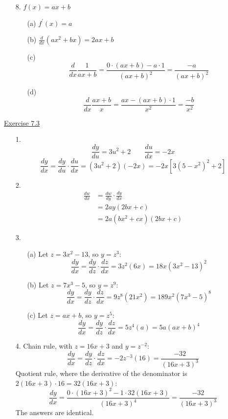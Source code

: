 \begin{enumerate}
\item[8.] $f(x)=a x+b$
\begin{enumerate}
\item[(a)] $f^{\prime}(x)=a$
\item[(b)] $\frac{d}{d x}\left(a x^{2}+b x\right)=2 a x+b$
\item[(c)] \[ \frac{d}{d x} \frac{1}{a x+b}=\frac{0 \cdot(a x+b)-a \cdot 1}{(a x+b)^{2}}=\frac{-a}{(a x+b)^{2}} \]
\item[(d)] \[ \frac{d}{d x} \frac{a x+b}{x}=\frac{a x-(a x+b) \cdot 1}{x^{2}}=\frac{-b}{x^{2}} \]
\end{enumerate}
\end{enumerate}

\underline{Exercise 7.3}
\begin{enumerate}
\item[1.]
\[ \frac{d y}{d u}=3 u^{2}+2 \qquad \frac{d u}{d x}=-2 x \]
\[ \frac{d y}{d x}=\frac{d y}{d u} \cdot \frac{d u}{d x}=\left(3 u^{2}+2\right)(-2 x)=-2 x\left[3\left(5-x^{2}\right)^{2}+2\right] \]

\item[2.]
\[
\begin{aligned}
\frac{d w}{d x} &=\frac{d w}{d y} \cdot \frac{d y}{d x} \\
&=2 a y(2 b x+c) \\
&=2 a\left(b x^{2}+c x\right)(2 b x+c)
\end{aligned}
\]

\item[3.]
\begin{enumerate}
\item[(a)] Let $z=3 x^{2}-13$, so $y=z^{3}$:
\[ \frac{d y}{d x}=\frac{d y}{d z} \cdot \frac{d z}{d x}=3 z^{2}(6 x)=18 x\left(3 x^{2}-13\right)^{2} \]
\item[(b)] Let $z=7 x^{3}-5$, so $y=z^{9}$:
\[ \frac{d y}{d x}=\frac{d y}{d z} \cdot \frac{d z}{d x}=9 z^{8}\left(21 x^{2}\right)=189 x^{2}\left(7 x^{3}-5\right)^{8} \]
\item[(c)] Let $z=a x+b$, so $y=z^{5}$:
\[ \frac{d y}{d x}=\frac{d y}{d z} \cdot \frac{d z}{d x}=5 z^{4}(a)=5 a(a x+b)^{4} \]
\end{enumerate}

\item[4.] Chain rule, with $z=16 x+3$ and $y=z^{-2}$:
\[ \frac{d y}{d x}=\frac{d y}{d z} \cdot \frac{d z}{d x}=-2 z^{-3}(16)=\frac{-32}{(16 x+3)^{3}} \]
Quotient rule, where the derivative of the denominator is $2(16 x+3) \cdot 16=32(16 x+3)$:
\[ \frac{d y}{d x}=\frac{0 \cdot(16 x+3)^{2}-1 \cdot 32(16 x+3)}{(16 x+3)^{4}}=\frac{-32}{(16 x+3)^{3}} \]
The answers are identical.


\end{enumerate}
